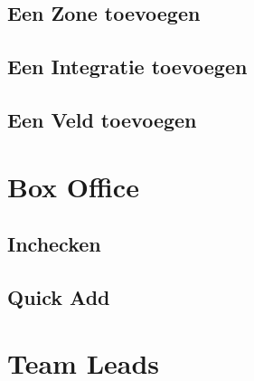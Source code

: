 \documentclass[]{memoir}
\begin{document}
\subsection{Een Zone toevoegen} \label{SetZone}
\subsection{Een Integratie toevoegen} \label{SetIntegration}
\subsection{Een Veld toevoegen} \label{SetField}

\section{Box Office} \label{BoxOfficeInstr}
\subsection{Inchecken} \label{BOCheckIn}
\subsection{Quick Add} \label{BOQuickAdd}

\section{Team Leads} \label{TeamLeadInstr}
\end{document}
